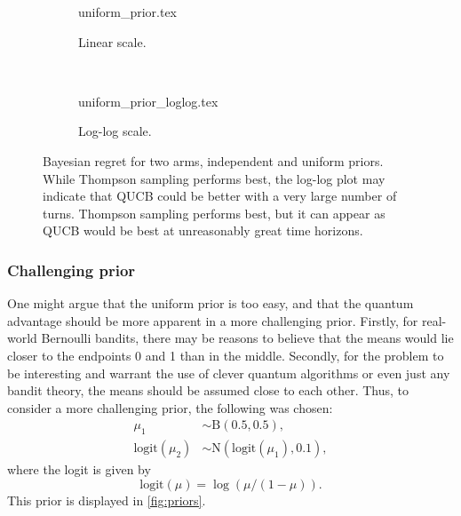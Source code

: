 \begin{figure}
    \centering
    \begin{subfigure}{\textwidth}
        \centering
        \newcommand{\myoptions}{
            width=10cm,
            height=8cm,
            xlabel={Kiloturn},
            ylabel={Regret},
            legend entries={UCB, QUCB, Thompson},
            legend pos=north west,
            legend cell align=left,
            mystyle,
            ymax = 150,
        }
        {uniform_prior.tex}
        \caption{Linear scale.}
    \end{subfigure}
    \\[3ex]
    \begin{subfigure}{\textwidth}
        \centering
        \newcommand{\myoptions}{
            width=10cm,
            height=8cm,
            xlabel={Turn},
            ylabel={Regret},
            legend entries={UCB, QUCB, Thompson},
            legend pos=north west,
            legend cell align=left,
            mystyle,
        }
        {uniform_prior_loglog.tex}
        \caption{Log-log scale.}
    \end{subfigure}
    \caption[
        Bayesian regret for two arms, independent and uniform priors.
    ]
    {
        Bayesian regret for two arms, independent and uniform priors.
        While Thompson sampling performs best, the log-log plot may indicate that QUCB could be better with a very large number of turns.
        Thompson sampling performs best, but it can appear as QUCB would be best at unreasonably great time horizons.
    }
    \label{fig:random}
\end{figure}


\subsubsection{Challenging prior}
One might argue that the uniform prior is too easy, and that the quantum advantage should be more apparent in a more challenging prior.
Firstly, for real-world Bernoulli bandits, there may be reasons to believe that the means would lie closer to the endpoints 0 and 1 than in the middle.
Secondly, for the problem to be interesting and warrant the use of clever quantum algorithms or even just any bandit theory, the means should be assumed close to each other.
Thus, to consider a more challenging prior, the following was chosen:
\begin{equation}
    \label{eq:challenging_prior}
    \begin{aligned}
        \mu_1               & \sim \text{B}(0.5, 0.5),                 \\
        \text{logit}(\mu_2) & \sim \text{N}(\text{logit}(\mu_1), 0.1),
    \end{aligned}
\end{equation}
where the logit is given by
\begin{equation}
    \label{eq:logit}
    \text{logit}(\mu) = \log(\mu/(1-\mu)).
\end{equation}
This prior is displayed in \cref{fig:priors}.


